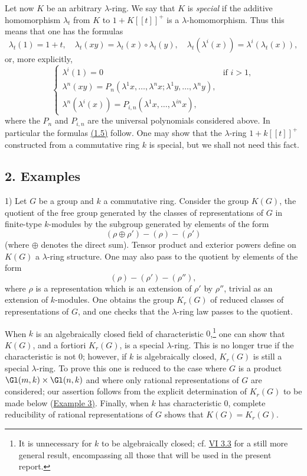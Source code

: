 Let now $K$ be an arbitrary $\lambda$-ring. We say that $K$ is \emph{special} if the additive homomorphism $\lambda_t$ from $K$ to $1+K[[t]]^+$ is a $\lambda$-homomorphism. Thus this means that one has the formulas
\begin{equation}\tag{1.10}
\lambda_t(1)=1+t,\quad
\lambda_t(xy)=\lambda_t(x)\circ\lambda_t(y),\quad
\lambda_t(\lambda^i(x))=\lambda^i(\lambda_t(x)),
\end{equation}
or, more explicitly,
\begin{equation}\tag{1.11}
\begin{cases}
\lambda^i(1)=0 & \text{if }i>1,\\
\lambda^n(xy)=P_n(\lambda^1x,\ldots,\lambda^n x;\lambda^1y,\ldots,\lambda^n y),\\
\lambda^n(\lambda^i(x))=P_{i,n}(\lambda^1x,\ldots,\lambda^{in}x),
\end{cases}
\end{equation}
where the $P_n$ and $P_{i,n}$ are the universal polynomials considered above. In particular the formulas \hyperlink{sga6.e00.eq.1-5}{(1.5)} follow. One may show that the $\lambda$-ring $1+k[[t]]^+$ constructed from a commutative ring $k$ is special, but we shall not need this fact.

\subsection*{2. Examples}

1) Let $G$ be a group and $k$ a commutative ring. Consider the group $K(G)$, the quotient of the free group generated by the classes of representations of $G$ in finite-type $k$-modules by the subgroup generated by elements of the form
\[
(\rho\oplus\rho')-(\rho)-(\rho')
\]
(where $\oplus$ denotes the direct sum). Tensor product and exterior powers define on $K(G)$ a $\lambda$-ring structure. One may also pass to the quotient by elements of the form
\[
(\rho)-(\rho')-(\rho''),
\]
where $\rho$ is a representation which is an extension of $\rho'$ by $\rho''$, trivial as an extension of $k$-modules. One obtains the group $K_r(G)$ of reduced classes of representations of $G$, and one checks that the $\lambda$-ring law passes to the quotient.

When $k$ is an algebraically closed field of characteristic $0$,\footnote{It is unnecessary for $k$ to be algebraically closed; cf. \hyperlink{sga6.e06.thm.3-3}{VI 3.3} for a still more general result, encompassing all those that will be used in the present report.} one can show that $K(G)$, and a fortiori $K_r(G)$, is a special $\lambda$-ring. This is no longer true if the characteristic is not $0$; however, if $k$ is algebraically closed, $K_r(G)$ is still a special $\lambda$-ring. To prove this one is reduced to the case where $G$ is a product $\Gl(m,k)\times\Gl(n,k)$ and where only rational representations of $G$ are considered; our assertion follows from the explicit determination of $K_r(G)$ to be made below (\hyperlink{sga6.e00.ex.2-3}{Example 3)}. Finally, when $k$ has characteristic $0$, complete reducibility of rational representations of $G$ shows that $K(G)=K_r(G)$.

